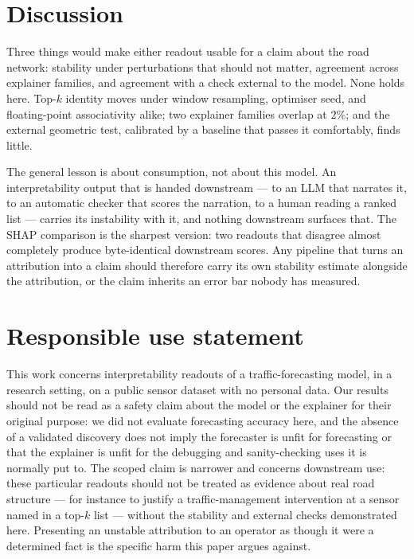 \documentclass{article}
\begin{document}
\section{Discussion}

Three things would make either readout usable for a claim about the road network:
stability under perturbations that should not matter, agreement across explainer
families, and agreement with a check external to the model. None holds here. Top-$k$
identity moves under window resampling, optimiser seed, and floating-point
associativity alike; two explainer families overlap at $2\%$; and the external
geometric test, calibrated by a baseline that passes it comfortably, finds little.

The general lesson is about consumption, not about this model. An interpretability
output that is handed downstream --- to an LLM that narrates it, to an automatic
checker that scores the narration, to a human reading a ranked list --- carries its
instability with it, and nothing downstream surfaces that. The SHAP comparison is the
sharpest version: two readouts that disagree almost completely produce byte-identical
downstream scores. Any pipeline that turns an attribution into a claim should
therefore carry its own stability estimate alongside the attribution, or the claim
inherits an error bar nobody has measured.

\section{Responsible use statement}

This work concerns interpretability readouts of a traffic-forecasting model, in a
research setting, on a public sensor dataset with no personal data. Our results
should not be read as a safety claim about the model or the explainer for their
original purpose: we did not evaluate forecasting accuracy here, and the absence of a
validated discovery does not imply the forecaster is unfit for forecasting or that
the explainer is unfit for the debugging and sanity-checking uses it is normally put
to. The scoped claim is narrower and concerns downstream use: these particular
readouts should not be treated as evidence about real road structure --- for instance
to justify a traffic-management intervention at a sensor named in a top-$k$ list ---
without the stability and external checks demonstrated here. Presenting an unstable
attribution to an operator as though it were a determined fact is the specific harm
this paper argues against.
\end{document}
